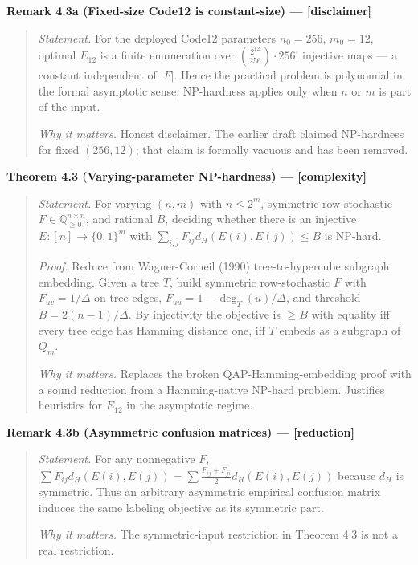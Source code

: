 \documentclass[
]{article}
\begin{document}
\textbf{Remark 4.3a (Fixed-size Code12 is constant-size) --- {[}disclaimer{]}}

\begin{quote}
\emph{Statement.} For the deployed Code12 parameters $n_0 = 256$,
$m_0 = 12$, optimal $E_{12}$ is a finite enumeration over
$\binom{2^{12}}{256} \cdot 256!$ injective maps --- a constant
independent of $|F|$. Hence the practical problem is polynomial in
the formal asymptotic sense; NP-hardness applies only when $n$ or
$m$ is part of the input.

\emph{Why it matters.} Honest disclaimer. The earlier draft claimed
NP-hardness for fixed $(256, 12)$; that claim is formally vacuous and
has been removed.
\end{quote}

\textbf{Theorem 4.3 (Varying-parameter NP-hardness) --- {[}complexity{]}}

\begin{quote}
\emph{Statement.} For varying $(n, m)$ with $n \leq 2^m$, symmetric
row-stochastic $F \in \mathbb{Q}_{\geq 0}^{n \times n}$, and rational
$B$, deciding whether there is an injective $E : [n] \to \{0, 1\}^m$
with $\sum_{i,j} F_{ij} d_H(E(i), E(j)) \leq B$ is NP-hard.

\emph{Proof.} Reduce from Wagner-Corneil (1990) tree-to-hypercube
subgraph embedding. Given a tree $T$, build symmetric row-stochastic
$F$ with $F_{uv} = 1/\Delta$ on tree edges, $F_{uu} = 1 -
\deg_T(u)/\Delta$, and threshold $B = 2(n-1)/\Delta$. By injectivity
the objective is $\geq B$ with equality iff every tree edge has
Hamming distance one, iff $T$ embeds as a subgraph of $Q_m$.

\emph{Why it matters.} Replaces the broken QAP-Hamming-embedding
proof with a sound reduction from a Hamming-native NP-hard problem.
Justifies heuristics for $E_{12}$ in the asymptotic regime.
\end{quote}

\textbf{Remark 4.3b (Asymmetric confusion matrices) --- {[}reduction{]}}

\begin{quote}
\emph{Statement.} For any nonnegative $F$, $\sum F_{ij} d_H(E(i),
E(j)) = \sum \frac{F_{ij}+F_{ji}}{2} d_H(E(i), E(j))$ because $d_H$
is symmetric. Thus an arbitrary asymmetric empirical confusion
matrix induces the same labeling objective as its symmetric part.

\emph{Why it matters.} The symmetric-input restriction in Theorem 4.3
is not a real restriction.
\end{quote}
\end{document}
